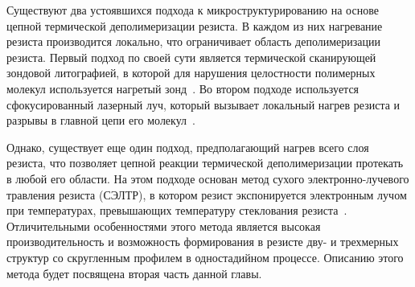 Существуют два устоявшихся подхода к микроструктурированию на основе цепной термической деполимеризации резиста.
В каждом из них нагревание резиста производится локально, что ограничивает область деполимеризации резиста.
Первый подход по своей сути является термической сканирующей зондовой литографией, в которой для нарушения целостности полимерных молекул используется нагретый зонд~\cite{depol_fabrication_probe}.
Во втором подходе используется сфокусированный лазерный луч, который вызывает локальный нагрев резиста и разрывы в главной цепи его молекул~\cite{depol_fabrication_laser}.

Однако, существует еще один подход, предполагающий нагрев всего слоя резиста, что позволяет цепной реакции термической деполимеризации протекать в любой его области. На этом подходе основан метод сухого электронно-лучевого травления резиста (СЭЛТР), в котором резист экспонируется электронным лучом при температурах, превышающих температуру стеклования резиста~\cite{Bruk_2016_mee}. Отличительными особенностями этого метода является высокая производительность и возможность формирования в резисте дву- и трехмерных структур со скругленным профилем в одностадийном процессе. Описанию этого метода будет посвящена вторая часть данной главы.
